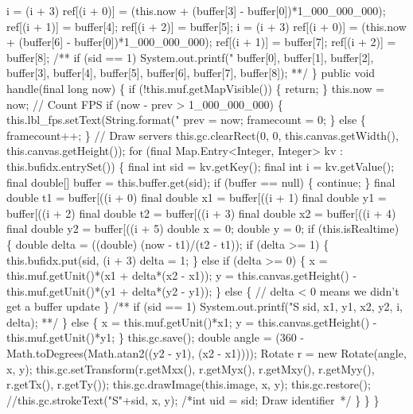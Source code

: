     i = (i + 3) %
    ref[(i + 0)] = (this.now + (buffer[3] - buffer[0])*1_000_000_000);
    ref[(i + 1)] = buffer[4];
    ref[(i + 2)] = buffer[5];
    i = (i + 3) %
    ref[(i + 0)] = (this.now + (buffer[6] - buffer[0])*1_000_000_000);
    ref[(i + 1)] = buffer[7];
    ref[(i + 2)] = buffer[8];
/**
if (sid == 1) System.out.printf("%
    buffer[0],
    buffer[1],
    buffer[2],
    buffer[3],
    buffer[4],
    buffer[5],
    buffer[6],
    buffer[7],
    buffer[8]);
**/
  \}
  public void handle(final long now) \{
    if (!this.muf.getMapVisible()) \{
      return;
    \}
    this.now = now;
    // Count FPS
    if (now - prev > 1_000_000_000) \{
      this.lbl_fps.setText(String.format("%
      prev = now;
      framecount = 0;
    \} else \{
      framecount++;
    \}
    // Draw servers
    this.gc.clearRect(0, 0, this.canvas.getWidth(), this.canvas.getHeight());
    for (final Map.Entry<Integer, Integer> kv : this.bufidx.entrySet()) \{
      final int sid = kv.getKey();
      final int i = kv.getValue();
      final double[] buffer = this.buffer.get(sid);
      if (buffer == null) \{
        continue;
      \}
      final double t1 = buffer[((i + 0) %
      final double x1 = buffer[((i + 1) %
      final double y1 = buffer[((i + 2) %
      final double t2 = buffer[((i + 3) %
      final double x2 = buffer[((i + 4) %
      final double y2 = buffer[((i + 5) %
      double x = 0;
      double y = 0;
      if (this.isRealtime) \{
        double delta = ((double) (now - t1)/(t2 - t1));
        if (delta >= 1) \{
          this.bufidx.put(sid, (i + 3) %
          delta = 1;
        \} else if (delta >= 0) \{
          x = this.muf.getUnit()*(x1 + delta*(x2 - x1));
          y = this.canvas.getHeight() - this.muf.getUnit()*(y1 + delta*(y2 - y1));
        \} else \{
          // delta < 0 means we didn't get a buffer update
        \}
/**
if (sid == 1) System.out.printf("S%
    sid, x1, y1, x2, y2, i, delta);
**/
      \} else \{
        x = this.muf.getUnit()*x1;
        y = this.canvas.getHeight() - this.muf.getUnit()*y1;
      \}
      this.gc.save();
      double angle = (360 - Math.toDegrees(Math.atan2((y2 - y1), (x2 - x1))));
      Rotate r = new Rotate(angle, x, y);
      this.gc.setTransform(r.getMxx(), r.getMyx(), r.getMxy(), r.getMyy(), r.getTx(), r.getTy());
      this.gc.drawImage(this.image, x, y);
      this.gc.restore();
      //this.gc.strokeText("S"+sid, x, y);
      /*int uid = sid;
      \LA{}Draw identifier~{\nwtagstyle{}}\RA{}*/
    \}
  \}
\}
\nwendcode{}\nwdocspar

